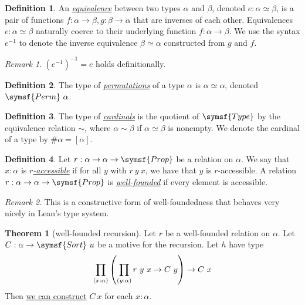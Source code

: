 \documentclass{article}
\newcommand{\mdef}[3]{\href{https://leanprover-community.github.io/mathlib4\_docs/Mathlib/#1.html\##2}{\emph{#3}}}
\newcommand{\corelem}[3]{\href{https://leanprover-community.github.io/mathlib4\_docs/#1.html\##2}{#3}}
\theoremstyle{definition}
\newtheorem{definition}{Definition}[section]
\newtheorem{theorem}{Theorem}[section]
\theoremstyle{remark}
\newtheorem*{remark}{Remark}
\begin{document}
\begin{definition}
    An \mdef{Logic/Equiv/Defs}{Equiv}{equivalence} between two types \( \alpha \) and \( \beta \), denoted \( e : \alpha \simeq \beta \), is a pair of functions \( f \colon \alpha \to \beta, g \colon \beta \to \alpha \) that are inverses of each other.
    Equivalences \( e : \alpha \simeq \beta \) naturally coerce to their underlying function \( f : \alpha \to \beta \).
    We use the syntax \( e^{-1} \) to denote the inverse equivalence \( \beta \simeq \alpha \) constructed from \( g \) and \( f \).
\end{definition}
\begin{remark}
    \( (e^{-1})^{-1} = e \) holds definitionally.
\end{remark}
\begin{definition}
    The type of \mdef{Logic/Equiv/Defs}{Equiv.Perm}{permutations} of a type \( \alpha \) is \( \alpha \simeq \alpha \), denoted \( \symsf{Perm}\ \alpha \).
\end{definition}
\begin{definition}
    The type of \mdef{SetTheory/Cardinal/Basic}{Cardinal}{cardinals} is the quotient of \( \symsf{Type} \) by the equivalence relation \( \sim \), where \( \alpha \sim \beta \) if \( \alpha \simeq \beta \) is nonempty.
    We denote the cardinal of a type by \( \#\alpha = [\alpha] \).
\end{definition}
\begin{definition}
    Let \( r : \alpha \to \alpha \to \symsf{Prop} \) be a relation on \( \alpha \).
    We say that \( x : \alpha \) is \mdef{Init/WF}{Acc}{\( r \)-accessible} if for all \( y \) with \( r\ y\ x \), we have that \( y \) is \( r \)-accessible.
    A relation \( r : \alpha \to \alpha \to \symsf{Prop} \) is \mdef{Init/WF}{WellFounded}{well-founded} if every element is accessible.
\end{definition}
\begin{remark}
    This is a constructive form of well-foundedness that behaves very nicely in Lean's type system.
\end{remark}
\begin{theorem}[well-founded recursion]
    Let \( r \) be a well-founded relation on \( \alpha \).
    Let \( C : \alpha \to \symsf{Sort}\ u \) be a motive for the recursion.
    Let \( h \) have type
    \[ \prod_{(x : \alpha)} \qty(\prod_{(y : \alpha)} r\ y\ x \to C\ y) \to C\ x \]
    Then \corelem{Init/WF}{WellFounded.recursion}{we can construct} \( C\ x \) for each \( x : \alpha \).
\end{theorem}
\end{document}
